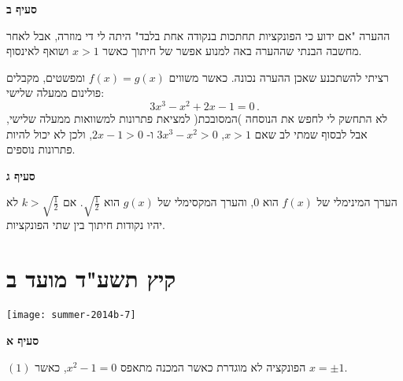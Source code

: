 \textbf{סעיף ב}
\begin{center}
\end{center}
ההערה "אם ידוע כי הפונקציות תחתכות בנקודה אחת בלבד" היתה לי די מוזרה, אבל לאחר מחשבה הבנתי שההערה באה למנוע אפשר של חיתוך כאשר
$x>1$
ושואף לאינסוף.

רציתי להשתכנע שאכן ההערה נכונה. כאשר משווים 
$f(x)=g(x)$
ומפשטים, מקבלים פולינום ממעלה שלישי:
\[
3x^3-x^2+2x-1=0\,.
\]
לא התחשק לי לחפש את הנוסחה )המסובכת( למציאת פתרונות למשוואות ממעלה שלישי, אבל לבסוף שמתי לב שאם
$x>1$,
$3x^3-x^2>0$
ו-%
$2x-1>0$,
ולכן לא יכול להיות פתרונות נוספים.

\textbf{סעיף ג}

הערך המינימלי של 
$f(x)$
הוא
$0$,
והערך המקסימלי של
$g(x)$
הוא
$\sqrt{\frac{1}{2}}$.
אם
$k>\sqrt{\frac{1}{2}}$
לא יהיו נקודות חיתוך בין שתי הפונקציות.



\section{קיץ תשע"ד מועד ב}

\begin{center}
\texttt{[image: summer-2014b-7]}
\end{center}

\vspace{-2ex}

\textbf{סעיף א}

$(1)$
הפונקציה לא מוגדרת כאשר המכנה מתאפס 
$x^2-1=0$,
כאשר 
$x=\pm 1$.

